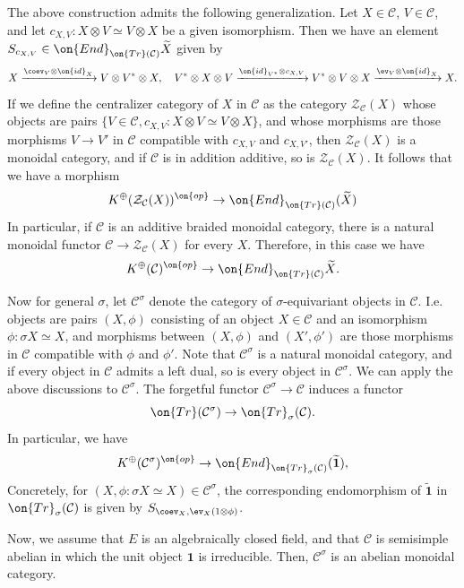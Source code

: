 \documentclass[11pt]{amsart}
\theoremstyle{definition}
\theoremstyle{definition}
\theoremstyle{definition}
\numberwithin{equation}{subsection}
\newcommand{\mC}{{\mathcal C}}
\newcommand{\mZ}{{\mathcal Z}}
\newcommand{\End}{{\on{End}}}
\newcommand{\id}{{\on{id}}}
\newcommand{\Tr}{{\on{Tr}}}
\begin{document}
The above construction admits the following generalization. Let $X\in \mC$, $V\in \mC$, and let $c_{X,V}: X\otimes V\simeq V\otimes X$ be a given isomorphism. Then we have an element $S_{c_{X,V}}\in \End_{\Tr(\mC)}\widetilde{X}$ given by
\[X\xrightarrow{\coev_V\otimes\id_X}V\otimes V^*\otimes X,   \quad V^*\otimes X\otimes V\xrightarrow{\id_{V^*}\otimes c_{X,V}} V^*\otimes V\otimes X\xrightarrow{\ev_V\otimes \id_X} X.\]
If we define the centralizer category of $X$ in $\mC$ as the category $\mZ_{\mC}(X)$ whose objects are pairs
$\{V\in\mC, c_{X,V}: X\otimes V\simeq V\otimes X\}$, and whose morphisms are those morphisms $V\to V'$ in $\mC$ compatible with $c_{X,V}$ and $c_{X,V'}$, then $\mZ_{\mC}(X)$ is a monoidal category, and if $\mC$ is in addition additive, so is $\mZ_{\mC}(X)$. It follows that we have a morphism
\begin{equation}
\label{E: K to End2}
K^{\oplus}(\mZ_{\mC}(X))^{\on{op}}\to \End_{\Tr(\mC)}(\widetilde X)
\end{equation}
In particular, if $\mC$ is an additive braided monoidal category, there is a natural monoidal functor $\mC\to \mZ_\mC(X)$ for every $X$. Therefore, in this case we have 
$$K^{\oplus}(\mC)^{\on{op}}\to \End_{\Tr(\mC)}\widetilde{X}.$$


Now for general $\sigma$, let $\mC^\sigma$ denote the category of $\sigma$-equivariant objects in $\mC$. I.e. objects are pairs $(X,\phi)$ consisting of an object $X\in\mC$ and an isomorphism $\phi: \sigma X\simeq X$, and morphisms between $(X,\phi)$ and $(X',\phi')$ are those morphisms in $\mC$ compatible with $\phi$ and $\phi'$. Note that $\mC^\sigma$ is a natural monoidal category, and if every object in $\mC$ admits a left dual, so is every object in $\mC^\sigma$. 
We can apply the above discussions to $\mC^\sigma$.
The forgetful functor $\mC^\sigma\to\mC$ induces a functor
\[\Tr(\mC^\sigma)\to \Tr_\sigma(\mC).\]
In particular, we have
\begin{equation}
\label{E: K to End3}
K^{\oplus}(\mC^\sigma)^{\on{op}}\to \End_{\Tr_\sigma(\mC)}(\widetilde{\mathbf 1}),
\end{equation}
Concretely, for $(X,\phi: \sigma X\simeq X)\in\mC^\sigma$, the corresponding endomorphism of $\widetilde{\mathbf 1}$ in $\Tr_\sigma(\mC)$ is given by $S_{\coev_X, \ev_X(1\otimes\phi)}$.


Now, we assume that $E$ is an algebraically closed field, and that $\mC$ is semisimple abelian in which the unit object $\mathbf{1}$ is irreducible. 
Then, $\mC^\sigma$ is an abelian monoidal category. 
\end{document}
